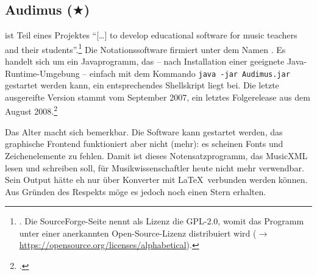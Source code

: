 %
%
%



\subsection{Audimus ($\bigstar$)}

\label{Audimus} ist Teil eines Projektes \enquote{[\ldots] to
develop educational software for music teachers and their
students}.\footnote{\cite[vgl.][\nopage wp]{Audimus2008a}. Die SourceForge-Seite
nennt als Lizenz die GPL-2.0, womit das Programm unter einer anerkannten
Open-Source-Lizenz distribuiert wird ($\rightarrow$
\href{https://opensource.org/licenses/alphabetical}
{https://opensource.org/licenses/alphabetical}).} Die Notationssoftware
firmiert unter dem Namen . Es handelt sich um ein
Javaprogramm, das -- nach Installation einer geeignete Java-Runtime-Umgebung --
einfach mit dem Kommando \texttt{java -jar Audimus.jar} gestartet werden kann,
ein entsprechendes Shellskript liegt bei. Die letzte ausgereifte Version stammt
vom September 2007, ein letztes Folgerelease aus dem August
2008.\footcite[vgl.][\nopage wp]{Audimus2008b}

Das Alter macht sich bemerkbar. Die Software kann gestartet werden, das
graphische Frontend funktioniert aber nicht (mehr): es scheinen Fonts und
Zeichenelemente zu fehlen. Damit ist dieses Notensatzprogramm, das MusicXML
lesen und schreiben soll, für Musikwissenschaftler heute nicht mehr verwendbar.
Sein Output hätte eh nur über Konverter mit \LaTeX\ verbunden werden können. Aus
Gründen des Respekts möge es jedoch noch einen Stern erhalten.



%
